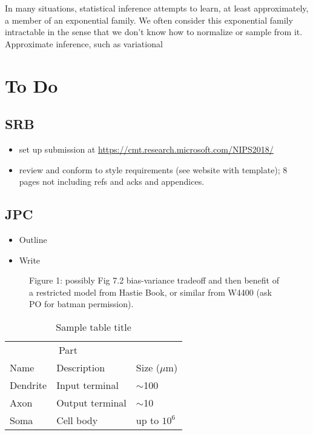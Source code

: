 \documentclass{article}
\begin{document}
 
  In many situations, statistical inference attempts to learn, at least approximately, a member of an exponential family. We often consider this exponential family intractable in the sense that we don't know how to normalize or sample from it.  Approximate inference, such as variational

\section{To Do}

\subsection{SRB}
\begin{itemize}
\item set up submission at   \url{https://cmt.research.microsoft.com/NIPS2018/}
\item review and conform to style requirements (see website with template); 8 pages not including refs and acks and appendices.
\end{itemize}

\subsection{JPC}
\begin{itemize}
\item Outline
\item Write
\end{itemize}




\begin{figure}
  \centering
  \fbox{\rule[-.5cm]{0cm}{4cm} \rule[-.5cm]{4cm}{0cm}}
  \caption{Figure 1: possibly Fig 7.2 bias-variance tradeoff and then benefit of a restricted model from Hastie Book, or similar from W4400 (ask PO for batman permission).}
\end{figure}



\begin{table}
  \caption{Sample table title}
  \label{sample-table}
  \centering
  \begin{tabular}{lll}
    \toprule
    \multicolumn{2}{c}{Part}                   \\
    \cmidrule(r){1-2}
    Name     & Description     & Size ($\mu$m) \\
    \midrule
    Dendrite & Input terminal  & $\sim$100     \\
    Axon     & Output terminal & $\sim$10      \\
    Soma     & Cell body       & up to $10^6$  \\
    \bottomrule
  \end{tabular}
\end{table}
\end{document}
